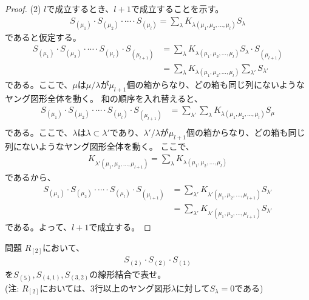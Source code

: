 \documentclass[a4paper,11pt]{jsarticle}
\theoremstyle{plain}
\theoremstyle{definition}
\renewcommand{\(}{\left(}
\renewcommand{\)}{\right)}
\renewcommand{\[}{\left[}
\renewcommand{\]}{\right]}
\renewcommand{\{}{\left\lbrace}
\renewcommand{\}}{\right\rbrace}
\begin{document}
\begin{proof}
    \subitem (2) $l$で成立するとき、$l+1$で成立することを示す。 \\
    \begin{align*}
        S_{(\mu_1)} \cdot S_{(\mu_2)} \cdot \cdots\cdot S_{(\mu_l)} = \sum_{\lambda} K_{\lambda (\mu_1, \mu_2, \ldots, \mu_l)} S_{\lambda}
    \end{align*}
    であると仮定する。
    \begin{align*}
        S_{(\mu_1)}\cdot S_{(\mu_2)}\cdot \cdots\cdot S_{(\mu_l)}\cdot S_{(\mu_{l+1})} &= \sum_{\lambda} K_{\lambda (\mu_1, \mu_2, \ldots, \mu_l)} S_{\lambda} \cdot S_{(\mu_{l+1})} \\
        &= \sum_{\lambda} K_{\lambda (\mu_1, \mu_2, \ldots, \mu_l)} \sum_{\lambda'} S_{\lambda'}
    \end{align*}
    である。ここで、$\mu$は$\mu/\lambda$が$\mu_{l+1}$個の箱からなり、どの箱も同じ列にないようなヤング図形全体を動く。
    和の順序を入れ替えると、
    \begin{align*}
        S_{(\mu_1)}\cdot S_{(\mu_2)}\cdot \cdots\cdot S_{(\mu_l)}\cdot S_{(\mu_{l+1})} &= \sum_{\lambda'} \sum_{\lambda} K_{\lambda (\mu_1, \mu_2, \ldots, \mu_l)} S_{\mu} \\
    \end{align*}
    である。ここで、$\lambda$は$\lambda \subset \lambda'$であり、$\lambda'/\lambda$が$\mu_{l+1}$個の箱からなり、どの箱も同じ列にないようなヤング図形全体を動く。
    ここで、
    \begin{align*}
        K_{\lambda' (\mu_1, \mu_2, \ldots, \mu_{l+1})} = \sum_{\lambda} K_{\lambda (\mu_1, \mu_2, \ldots, \mu_l)}
    \end{align*}
    であるから、
    \begin{align*}
        S_{(\mu_1)}\cdot S_{(\mu_2)}\cdot \cdots\cdot S_{(\mu_l)}\cdot S_{(\mu_{l+1})} &= \sum_{\lambda'} K_{\lambda' (\mu_1, \mu_2, \ldots, \mu_{l+1})} S_{\lambda'} \\
        &= \sum_{\lambda'} K_{\lambda' (\mu_1, \mu_2, \ldots, \mu_{l+1})} S_{\lambda'}
    \end{align*}
    である。よって、$l+1$で成立する。
\end{proof}


\begin{itembox}[l]{問題}
    $R_{[2]}$において、
    \begin{align*}
        S_{(2)} \cdot S_{(2)} \cdot S_{(1)}
    \end{align*}
    を$S_{(5)}, S_{(4,1)}, S_{(3,2)}$の線形結合で表せ。\\
    (注: $R_{[2]}$においては、3行以上のヤング図形$\lambda$に対して$S_{\lambda} = 0$である)
\end{itembox}
\end{document}
